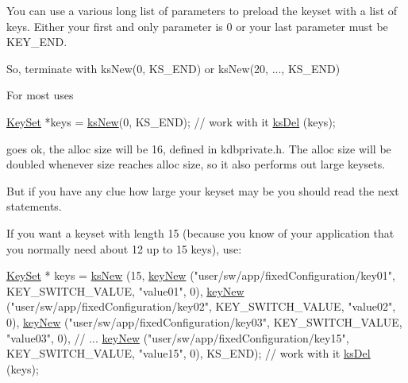 You can use a various long list of parameters to preload the keyset with a list of keys. Either your first and only parameter is 0 or your last parameter must be K\-E\-Y\-\_\-\-E\-N\-D.

So, terminate with ks\-New(0, K\-S\-\_\-\-E\-N\-D) or ks\-New(20, ..., K\-S\-\_\-\-E\-N\-D)

For most uses 
\begin{DoxyCode}
\hyperlink{classkdb_1_1KeySet_a4eac9850fa4f06c07a5306befc3e4377}{KeySet} *keys = \hyperlink{group__keyset_ga671e1aaee3ae9dc13b4834a4ddbd2c3c}{ksNew}(0, KS\_END);
\textcolor{comment}{// work with it}
\hyperlink{group__keyset_ga27e5c16473b02a422238c8d970db7ac8}{ksDel} (keys);
\end{DoxyCode}
 goes ok, the alloc size will be 16, defined in kdbprivate.\-h. The alloc size will be doubled whenever size reaches alloc size, so it also performs out large keysets.

But if you have any clue how large your keyset may be you should read the next statements.

If you want a keyset with length 15 (because you know of your application that you normally need about 12 up to 15 keys), use\-: 
\begin{DoxyCode}
\hyperlink{classkdb_1_1KeySet_a4eac9850fa4f06c07a5306befc3e4377}{KeySet} * keys = \hyperlink{group__keyset_ga671e1aaee3ae9dc13b4834a4ddbd2c3c}{ksNew} (15,
        \hyperlink{group__key_gad23c65b44bf48d773759e1f9a4d43b89}{keyNew} (\textcolor{stringliteral}{"user/sw/app/fixedConfiguration/key01"}, KEY\_SWITCH\_VALUE,
       \textcolor{stringliteral}{"value01"}, 0),
        \hyperlink{group__key_gad23c65b44bf48d773759e1f9a4d43b89}{keyNew} (\textcolor{stringliteral}{"user/sw/app/fixedConfiguration/key02"}, KEY\_SWITCH\_VALUE,
       \textcolor{stringliteral}{"value02"}, 0),
        \hyperlink{group__key_gad23c65b44bf48d773759e1f9a4d43b89}{keyNew} (\textcolor{stringliteral}{"user/sw/app/fixedConfiguration/key03"}, KEY\_SWITCH\_VALUE,
       \textcolor{stringliteral}{"value03"}, 0),
        \textcolor{comment}{// ...}
        \hyperlink{group__key_gad23c65b44bf48d773759e1f9a4d43b89}{keyNew} (\textcolor{stringliteral}{"user/sw/app/fixedConfiguration/key15"}, KEY\_SWITCH\_VALUE,
       \textcolor{stringliteral}{"value15"}, 0),
        KS\_END);
\textcolor{comment}{// work with it}
\hyperlink{group__keyset_ga27e5c16473b02a422238c8d970db7ac8}{ksDel} (keys);
\end{DoxyCode}



